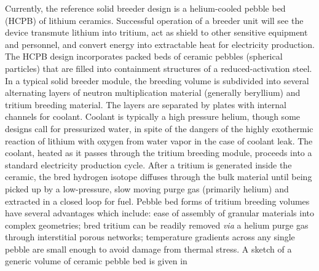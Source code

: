 Currently, the reference solid breeder design is a helium-cooled pebble bed (HCPB) of lithium ceramics. Successful operation of a breeder unit will see the device transmute lithium into tritium, act as shield to other sensitive equipment and personnel, and convert energy into extractable heat for electricity production. The HCPB design incorporates packed beds of ceramic pebbles (spherical particles) that are filled into containment structures of a reduced-activation steel. In a typical solid breeder module, the breeding volume is subdivided into several alternating layers of neutron multiplication material (generally beryllium) and tritium breeding material. The layers are separated by plates with internal channels for coolant. Coolant is typically a high pressure helium, though some designs call for pressurized water, in spite of the dangers of the highly exothermic reaction of lithium with oxygen from water vapor in the case of coolant leak. The coolant, heated as it passes through the tritium breeding module, proceeds into a standard electricity production cycle. After a tritium is generated inside the ceramic, the bred hydrogen isotope diffuses through the bulk material until being picked up by a low-pressure, slow moving purge gas (primarily helium) and extracted in a closed loop for fuel. Pebble bed forms of tritium breeding volumes have several advantages which include: ease of assembly of granular materials into complex geometries; bred tritium can be readily removed \textit{via} a helium purge gas through interstitial porous networks; temperature gradients across any single pebble are small enough to avoid damage from thermal stress. A sketch of a generic volume of ceramic pebble bed is given in 

